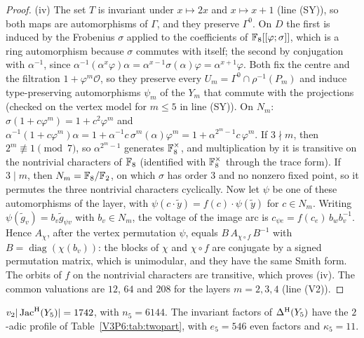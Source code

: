 \begin{proof}
(iv) The set $T$ is invariant under $x\mapsto2x$ and $x\mapsto x+1$ (line (SY)), so both maps
are automorphisms of $\Gamma$, and they preserve $\Gamma^{0}$. On $D$ the first is induced by the
Frobenius $\sigma$ applied to the coefficients of $\mathbb{F}_8[[\varphi;\sigma]]$, which is a ring
automorphism because $\sigma$ commutes with itself; the second by conjugation with $\alpha^{-1}$,
since $\alpha^{-1}(\alpha^{x}\varphi)\alpha=\alpha^{x-1}\sigma(\alpha)\varphi=\alpha^{x+1}\varphi$.
Both fix the centre and the filtration $1+\varphi^{m}\mathcal O$, so they preserve every
$U_m=\Gamma^{0}\cap\rho^{-1}(P_m)$ and induce type-preserving automorphisms $\psi_m$ of the
$Y_m$ that commute with the projections (checked on the vertex model for $m\le5$ in line (SY)). On
$N_m$: $\sigma(1+c\varphi^{m})=1+c^{2}\varphi^{m}$ and
$\alpha^{-1}(1+c\varphi^{m})\alpha=1+\alpha^{-1}c\,\sigma^{m}(\alpha)\varphi^{m}
=1+\alpha^{2^{m}-1}c\,\varphi^{m}$. If $3\nmid m$, then $2^{m}\not\equiv1\pmod7$, so
$\alpha^{2^{m}-1}$ generates $\mathbb{F}_8^{\times}$, and multiplication by it is transitive on the
nontrivial characters of $\mathbb{F}_8$ (identified with $\mathbb{F}_8^{\times}$ through the trace form). If
$3\mid m$, then $N_m=\mathbb{F}_8/\mathbb{F}_2$, on which $\sigma$ has order $3$ and no nonzero fixed point, so
it permutes the three nontrivial characters cyclically. Now let $\psi$ be one of these
automorphisms of the layer, with $\psi(c\cdot\tilde y)=f(c)\cdot\psi(\tilde y)$ for $c\in N_m$.
Writing $\psi(\tilde g_v)=b_v\tilde g_{\psi v}$ with $b_v\in N_m$, the voltage of the image arc is
$c_{\psi e}=f(c_e)\,b_wb_v^{-1}$. Hence $A_\chi$, after the vertex permutation $\psi$, equals
$B\,A_{\chi\circ f}\,B^{-1}$ with $B=\operatorname{diag}(\chi(b_v))$: the blocks of $\chi$ and
$\chi\circ f$ are conjugate by a signed permutation matrix, which is unimodular, and they have
the same Smith form. The orbits of $f$ on the nontrivial characters are transitive, which proves
(iv). The common valuations are $12$, $64$ and $208$ for the layers $m=2,3,4$ (line (V2)).
\end{proof}

\begin{theorem}\label{V3P6:thm:v2five}
$v_2|\operatorname{Jac}^{\mathrm{H}}(Y_5)|=1742$, with $n_5=6144$. The invariant factors of $\Delta^{\mathrm{H}}(Y_5)$ have the
$2$-adic profile of Table~\ref{V3P6:tab:twopart}, with $e_5=546$ even factors and
$\kappa_5=11$.
\end{theorem}

